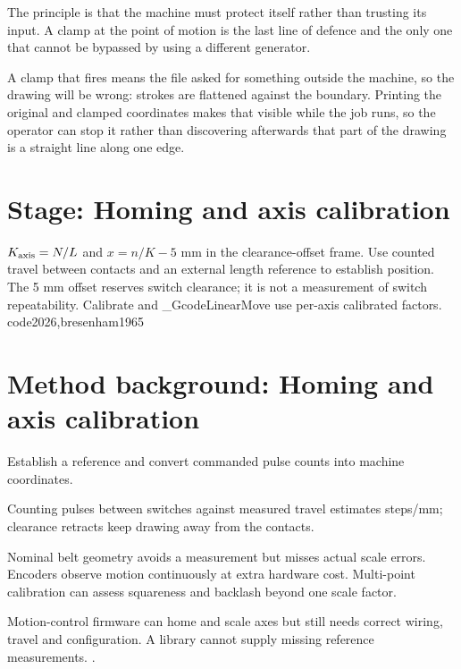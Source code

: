 The principle is that the machine must protect itself rather than trusting its input. A clamp at the point of motion is the last line of defence and the only one that cannot be bypassed by using a different generator.


A clamp that fires means the file asked for something outside the machine, so the drawing will be wrong: strokes are flattened against the boundary. Printing the original and clamped coordinates makes that visible while the job runs, so the operator can stop it rather than discovering afterwards that part of the drawing is a straight line along one edge.



\section*{Stage: Homing and axis calibration}
{$K_{\rm axis}=N/L$ and $x=n/K-5$ mm in the clearance-offset frame.}
{Use counted travel between contacts and an external length reference to
establish position. The 5 mm offset reserves switch clearance; it is not a
measurement of switch repeatability.}
{Calibrate and \_GcodeLinearMove use per-axis calibrated factors.}
{code2026,bresenham1965}


\section{Method background: Homing and axis calibration}\label{method:calibrate}
Establish a reference and convert commanded pulse counts into machine coordinates.


Counting pulses between switches against measured travel estimates steps/mm; clearance retracts keep drawing away from the contacts.


Nominal belt geometry avoids a measurement but misses actual scale errors. Encoders observe motion continuously at extra hardware cost. Multi-point calibration can assess squareness and backlash beyond one scale factor.


Motion-control firmware can home and scale axes but still needs correct wiring, travel and configuration. A library cannot supply missing reference measurements. \cite{a4988datasheet,bresenham1965,code2026}.


